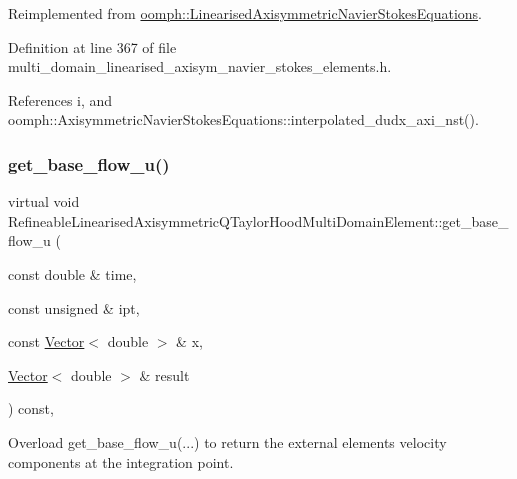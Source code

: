 Reimplemented from \hyperlink{classoomph_1_1LinearisedAxisymmetricNavierStokesEquations_aa3924125dde70779c180b84408271422}{oomph\+::\+Linearised\+Axisymmetric\+Navier\+Stokes\+Equations}.



Definition at line 367 of file multi\+\_\+domain\+\_\+linearised\+\_\+axisym\+\_\+navier\+\_\+stokes\+\_\+elements.\+h.



References i, and oomph\+::\+Axisymmetric\+Navier\+Stokes\+Equations\+::interpolated\+\_\+dudx\+\_\+axi\+\_\+nst().

\mbox{\label{classRefineableLinearisedAxisymmetricQTaylorHoodMultiDomainElement_aa1337108dab29eed1dc7b27d8f15382a}} 
\subsubsection{\texorpdfstring{get\+\_\+base\+\_\+flow\+\_\+u()}{get\_base\_flow\_u()}}
{\footnotesize\ttfamily virtual void Refineable\+Linearised\+Axisymmetric\+Q\+Taylor\+Hood\+Multi\+Domain\+Element\+::get\+\_\+base\+\_\+flow\+\_\+u (\begin{DoxyParamCaption}\item[{const double \&}]{time,  }\item[{const unsigned \&}]{ipt,  }\item[{const \hyperlink{classoomph_1_1Vector}{Vector}$<$ double $>$ \&}]{x,  }\item[{\hyperlink{classoomph_1_1Vector}{Vector}$<$ double $>$ \&}]{result }\end{DoxyParamCaption}) const\hspace{0.3cm}{\ttfamily [inline]}, {\ttfamily [virtual]}}



Overload get\+\_\+base\+\_\+flow\+\_\+u(...) to return the external element\textquotesingle{}s velocity components at the integration point. 



